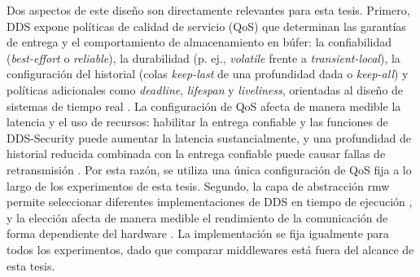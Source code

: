 Dos aspectos de este diseño son directamente relevantes para esta tesis.
Primero, DDS expone políticas de calidad de servicio (QoS) que determinan
las garantías de entrega y el comportamiento de almacenamiento en búfer: la
confiabilidad (\emph{best-effort} o \emph{reliable}), la durabilidad (p.
ej., \emph{volatile} frente a \emph{transient-local}), la configuración del
historial (colas \emph{keep-last} de una profundidad dada o \emph{keep-all})
y políticas adicionales como \emph{deadline}, \emph{lifespan} y
\emph{liveliness}, orientadas al diseño de sistemas de tiempo real
\cite{macenski2022,zotero-item-9}. La configuración de QoS afecta de manera
medible la latencia y el uso de recursos: habilitar la entrega confiable y
las funciones de DDS-Security puede aumentar la latencia sustancialmente, y
una profundidad de historial reducida combinada con la entrega confiable
puede causar fallas de retransmisión \cite{fernandez2020,kronauer2021}. Por
esta razón, se utiliza una única configuración de QoS fija a lo largo de los
experimentos de esta tesis. Segundo, la capa de abstracción rmw permite
seleccionar diferentes implementaciones de DDS en tiempo de ejecución
\cite{maruyama2016, macenski2022}, y la elección afecta de manera medible el
rendimiento de la comunicación de forma dependiente del hardware
\cite{maruyama2016, kronauer2021, zhang2024}. La implementación se fija
igualmente para todos los experimentos, dado que comparar middlewares está
fuera del alcance de esta tesis.

